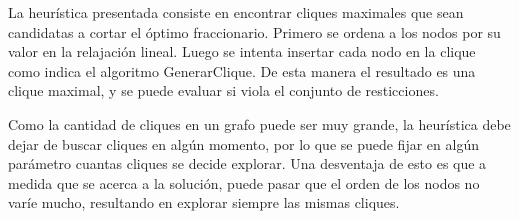 La heur\'istica presentada consiste en encontrar cliques maximales que sean candidatas a cortar el \'optimo fraccionario. Primero se ordena a los
nodos por su valor en la relajaci\'on lineal. Luego se intenta insertar cada nodo en la clique como indica el algoritmo GenerarClique. De esta manera
el resultado es una clique maximal, y se puede evaluar si viola el conjunto de resticciones.

Como la cantidad de cliques en un grafo puede ser muy grande, la heur\'istica debe dejar de buscar cliques en alg\'un momento, por lo que se puede
fijar en alg\'un par\'ametro cuantas cliques se decide explorar.
Una desventaja de esto es que a medida que se acerca a la soluci\'on, puede pasar que el orden de los nodos no var\'ie mucho, resultando en explorar siempre las mismas cliques.







